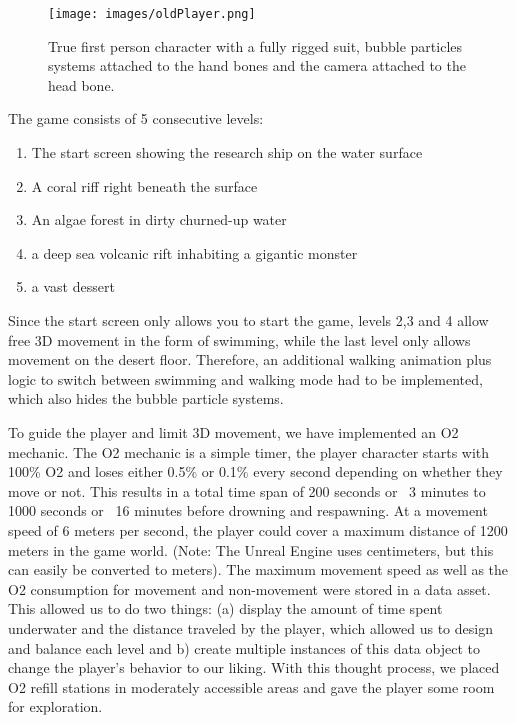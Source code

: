 \documentclass[letterpaper, 10 pt, conference]{ieeeconf}  %
\begin{document}
\begin{figure}[!ht]
    \caption{True first person character with a fully rigged suit, bubble particles systems attached to the hand bones and the camera attached to the head bone.}
    \centering
    \texttt{[image: images/oldPlayer.png]}
    \label{fig:oldPlayer}
\end{figure}

The game consists of 5 consecutive levels:
\begin{enumerate}
    \item The start screen showing the research ship on the water surface
    \item A coral riff right beneath the surface
    \item An algae forest in dirty churned-up water
    \item a deep sea volcanic rift inhabiting a gigantic monster
    \item a vast dessert
\end{enumerate}

Since the start screen only allows you to start the game, levels 2,3 and 4 allow free 3D movement in the form of swimming, while the last level only allows movement on the desert floor.
Therefore, an additional walking animation plus logic to switch between swimming and walking mode had to be implemented, which also hides the bubble particle systems.

To guide the player and limit 3D movement, we have implemented an O2 mechanic.
The O2 mechanic is a simple timer, the player character starts with 100\% O2 and loses either 0.5\% or 0.1\% every second depending on whether they move or not.
This results in a total time span of 200 seconds or ~3 minutes to 1000 seconds or ~16 minutes before drowning and respawning.
At a movement speed of 6 meters per second, the player could cover a maximum distance of 1200 meters in the game world.
(Note: The Unreal Engine uses centimeters, but this can easily be converted to meters). 
The maximum movement speed as well as the O2 consumption for movement and non-movement were stored in a data asset.
This allowed us to do two things:
(a) display the amount of time spent underwater and the distance traveled by the player, which allowed us to design and balance each level
and b) create multiple instances of this data object to change the player's behavior to our liking.
With this thought process, we placed O2 refill stations in moderately accessible areas and gave the player some room for exploration.
\end{document}
